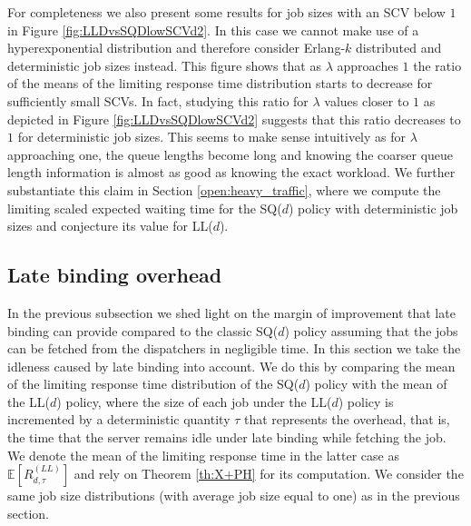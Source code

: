 \documentclass[12pt]{report}
\newcommand{\E}{\mathbb{E}}
\begin{document}
For completeness we also present some results for job sizes with an SCV below $1$ in Figure \ref{fig:LLDvsSQDlowSCVd2}. 
In this case we cannot make use of a hyperexponential distribution and therefore consider Erlang-$k$ distributed 
and deterministic job sizes instead. 
This figure shows that as $\lambda$ approaches $1$ the ratio of the means of the limiting response time distribution
starts to decrease for sufficiently small SCVs. In fact, studying this ratio for $\lambda$ values closer to $1$ as depicted in Figure \ref{fig:LLDvsSQDlowSCVd2}
suggests that this ratio decreases to $1$ for deterministic job sizes. This seems to make sense intuitively as
for $\lambda$ approaching one, the queue lengths become long and knowing the coarser queue length information
is almost as good as knowing the exact workload. We further substantiate this claim in Section \ref{open:heavy_traffic}, where we compute the limiting scaled expected waiting time for the SQ($d$) policy with deterministic job sizes and conjecture its value for LL($d$).

\subsection{Late binding overhead}\label{sec:overhead}
In the previous subsection we shed light on the margin of improvement that late binding can provide
compared to the classic SQ($d$) policy assuming that the jobs can be fetched from the dispatchers in negligible time.
In this section we take the idleness caused by late binding into account.
We do this by comparing the mean of the limiting response time distribution of the SQ($d$) policy with the mean of the LL($d$) policy, 
where the size of each job under the LL($d$) policy is incremented by a deterministic quantity $\tau$ that represents the overhead, that is,
the time that the server remains idle under late binding while fetching the job. We denote the mean of the limiting response time in the latter case as $\E[R_{d,\tau}^{(LL)}]$ and rely on Theorem \ref{th:X+PH} for its computation. We consider the same job size distributions 
(with average job size equal to one) as in the previous section. 
\end{document}
